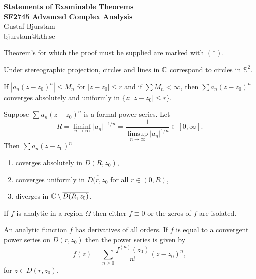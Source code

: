 \documentclass[12pt]{article}
\begin{document}
\begin{center}
\textbf{\large Statements of Examinable Theorems \\ SF2745 Advanced Complex Analysis} \\
Gustaf Bjurstam\\
bjurstam@kth.se\\
\end{center}

\begin{remark}
    Theorem's for which the proof must be supplied are marked with $(*)$.
\end{remark}

\begin{sats}
    Under stereographic projection, circles and lines in $\mathbb{C}$ correspond to circles in $\mathbb{S}^2$.
\end{sats}

\begin{sats}[M test {$*$}]
    If $|a_n(z-z_0)^n|\leq M_n$ for $|z-z_0|\leq r$ and if $\sum M_n<\infty$, then $\sum a_n(z-z_0)^n$ converges absolutely and uniformly in $\{z:|z-z_0|\leq r\}$.
\end{sats}

\begin{sats}
    Suppose $\sum a_n(z-z_0)^n$ is a formal power series. Let
    \begin{equation*}
        R=\liminf_{n\to\infty} |a_n|^{-1/n}=\frac{1}{\limsup_{n\to\infty} |a_n|^{1/n}}\in [0, \infty].
    \end{equation*}
    Then $\sum a_n(z-z_0)^n$
    \begin{enumerate}[label=(\alph*)]
        \item coverges absolutely in $D(R,z_0)$,
        \item converges uniformly in $\overline{D(r,z_0}$ for all $r\in(0,R)$,
        \item diverges in $\mathbb{C}\setminus\overline{D(R,z_0)}$.
    \end{enumerate}
\end{sats}

\begin{sats}[Uniqueness $*$]
    If $f$ is analytic in a region $\Omega$ then either $f\equiv 0$ or the zeros of $f$ are isolated.
\end{sats}

\begin{sats}
An analytic function $f$ has derivatives of all orders. If $f$ is equal to a convergent power series on $D(r,z_0)$ then the power series is given by 
\begin{equation*}
    f(z)=\sum_{n\geq 0} \frac{f^{(n)}(z_0)}{n!}(z-z_0)^n,
\end{equation*}
for $z\in D(r,z_0)$.
\end{sats}
\end{document}
